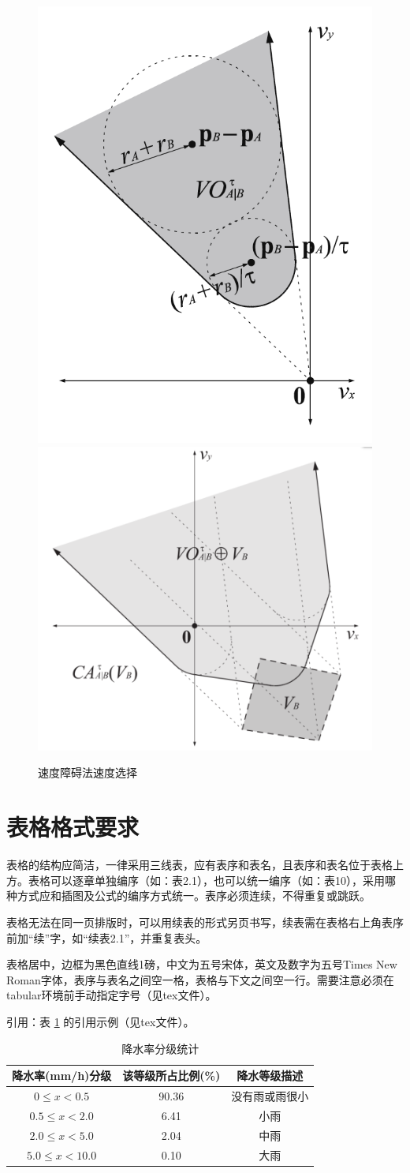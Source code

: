 \documentclass{seuthesis-2022}
\begin{document}
\begin{figure}[H]
    \centering
      {\includegraphics[width=0.3\linewidth]{fig/速度障碍集合.png}}
      {\includegraphics[width=0.4\linewidth]{fig/避免碰撞集合.png}}
    \caption{速度障碍法速度选择}
    \label{fig:2}
\end{figure}

\section{表格格式要求}
表格的结构应简洁，一律采用三线表，应有表序和表名，且表序和表名位于表格上方。表格可以逐章单独编序（如：表2.1），也可以统一编序（如：表10），采用哪种方式应和插图及公式的编序方式统一。表序必须连续，不得重复或跳跃。

表格无法在同一页排版时，可以用续表的形式另页书写，续表需在表格右上角表序前加“续”字，如“续表2.1”，并重复表头。

表格居中，边框为黑色直线1磅，中文为五号宋体，英文及数字为五号Times New Roman字体，表序与表名之间空一格，表格与下文之间空一行。需要注意必须在tabular环境前手动指定字号（见tex文件）。

引用：表 \ref{tab:1} 的引用示例（见tex文件）。

\begin{table}
  \centering
  \caption{降水率分级统计}
  \label{tab:1}
  \small
  \begin{tabular}{ccc}
    \toprule
    降水率(mm/h)分级 & 该等级所占比例(\%) & 降水等级描述\\
    \midrule
    $0\le x< 0.5$ & 90.36 & 没有雨或雨很小\\
    $0.5\le x< 2.0$ & 6.41 & 小雨\\
    $2.0\le x< 5.0$ & 2.04 & 中雨\\
    $5.0\le x< 10.0$ & 0.10 & 大雨\\
    \bottomrule
  \end{tabular}
\end{table}
\end{document}
